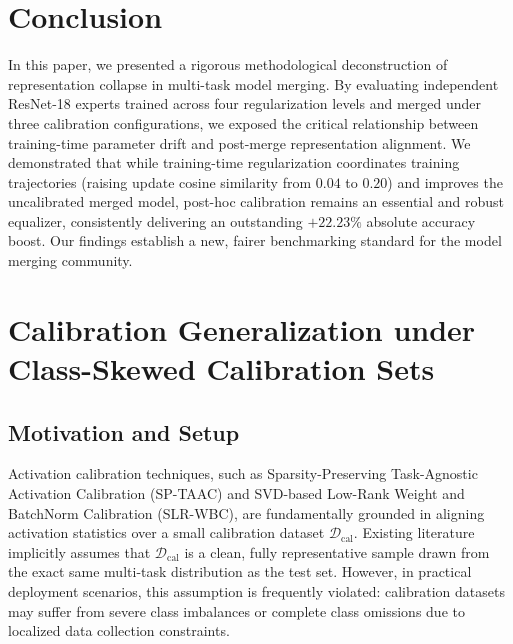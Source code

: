 \documentclass{article}
\theoremstyle{plain}
\theoremstyle{definition}
\theoremstyle{remark}
\begin{document}
\section{Conclusion}
In this paper, we presented a rigorous methodological deconstruction of representation collapse in multi-task model merging. By evaluating independent ResNet-18 experts trained across four regularization levels and merged under three calibration configurations, we exposed the critical relationship between training-time parameter drift and post-merge representation alignment. We demonstrated that while training-time regularization coordinates training trajectories (raising update cosine similarity from $0.04$ to $0.20$) and improves the uncalibrated merged model, post-hoc calibration remains an essential and robust equalizer, consistently delivering an outstanding $+22.23\%$ absolute accuracy boost. Our findings establish a new, fairer benchmarking standard for the model merging community.




\newpage
\appendix
\onecolumn
{}

\section{Calibration Generalization under Class-Skewed Calibration Sets}
\label{appendix:class_bias}

\subsection{Motivation and Setup}
Activation calibration techniques, such as Sparsity-Preserving Task-Agnostic Activation Calibration (SP-TAAC) and SVD-based Low-Rank Weight and BatchNorm Calibration (SLR-WBC), are fundamentally grounded in aligning activation statistics over a small calibration dataset $\mathcal{D}_{\text{cal}}$. Existing literature implicitly assumes that $\mathcal{D}_{\text{cal}}$ is a clean, fully representative sample drawn from the exact same multi-task distribution as the test set. However, in practical deployment scenarios, this assumption is frequently violated: calibration datasets may suffer from severe class imbalances or complete class omissions due to localized data collection constraints.
\end{document}
